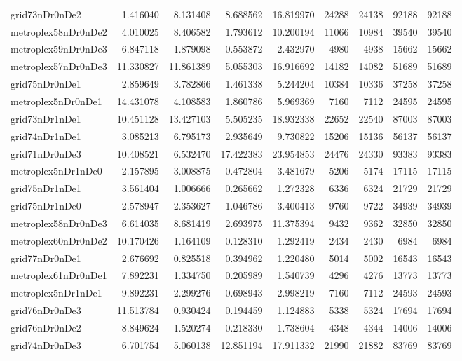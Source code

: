 \begin{longtable}{|l|r|r|r|r|r|r|r|r|}
grid73nDr0nDe2 & 1.416040 & 8.131408 & 8.688562 & 16.819970 & 24288 & 24138 & 92188 & 92188 \\
metroplex58nDr0nDe2 & 4.010025 & 8.406582 & 1.793612 & 10.200194 & 11066 & 10984 & 39540 & 39540 \\
metroplex59nDr0nDe3 & 6.847118 & 1.879098 & 0.553872 & 2.432970 & 4980 & 4938 & 15662 & 15662 \\
metroplex57nDr0nDe3 & 11.330827 & 11.861389 & 5.055303 & 16.916692 & 14182 & 14082 & 51689 & 51689 \\
grid75nDr0nDe1 & 2.859649 & 3.782866 & 1.461338 & 5.244204 & 10384 & 10336 & 37258 & 37258 \\
metroplex5nDr0nDe1 & 14.431078 & 4.108583 & 1.860786 & 5.969369 & 7160 & 7112 & 24595 & 24595 \\
grid73nDr1nDe1 & 10.451128 & 13.427103 & 5.505235 & 18.932338 & 22652 & 22540 & 87003 & 87003 \\
grid74nDr1nDe1 & 3.085213 & 6.795173 & 2.935649 & 9.730822 & 15206 & 15136 & 56137 & 56137 \\
grid71nDr0nDe3 & 10.408521 & 6.532470 & 17.422383 & 23.954853 & 24476 & 24330 & 93383 & 93383 \\
metroplex5nDr1nDe0 & 2.157895 & 3.008875 & 0.472804 & 3.481679 & 5206 & 5174 & 17115 & 17115 \\
grid75nDr1nDe1 & 3.561404 & 1.006666 & 0.265662 & 1.272328 & 6336 & 6324 & 21729 & 21729 \\
grid75nDr1nDe0 & 2.578947 & 2.353627 & 1.046786 & 3.400413 & 9760 & 9722 & 34939 & 34939 \\
metroplex58nDr0nDe3 & 6.614035 & 8.681419 & 2.693975 & 11.375394 & 9432 & 9362 & 32850 & 32850 \\
metroplex60nDr0nDe2 & 10.170426 & 1.164109 & 0.128310 & 1.292419 & 2434 & 2430 & 6984 & 6984 \\
grid77nDr0nDe1 & 2.676692 & 0.825518 & 0.394962 & 1.220480 & 5014 & 5002 & 16543 & 16543 \\
metroplex61nDr0nDe1 & 7.892231 & 1.334750 & 0.205989 & 1.540739 & 4296 & 4276 & 13773 & 13773 \\
metroplex5nDr1nDe1 & 9.892231 & 2.299276 & 0.698943 & 2.998219 & 7160 & 7112 & 24593 & 24593 \\
grid76nDr0nDe3 & 11.513784 & 0.930424 & 0.194459 & 1.124883 & 5338 & 5324 & 17694 & 17694 \\
grid76nDr0nDe2 & 8.849624 & 1.520274 & 0.218330 & 1.738604 & 4348 & 4344 & 14006 & 14006 \\
grid74nDr0nDe3 & 6.701754 & 5.060138 & 12.851194 & 17.911332 & 21990 & 21882 & 83769 & 83769 \\

\end{longtable}

